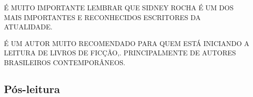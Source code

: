 \documentclass{extarticle}
\begin{document}

 
É MUITO IMPORTANTE LEMBRAR QUE SIDNEY ROCHA É UM DOS MAIS IMPORTANTES E
RECONHECIDOS ESCRITORES DA ATUALIDADE.
 
É UM AUTOR MUITO RECOMENDADO PARA QUEM ESTÁ INICIANDO A LEITURA DE
LIVROS DE FICÇÃO,. PRINCIPALMENTE DE AUTORES BRASILEIROS CONTEMPORÂNEOS.





\subsection{Pós-leitura}






\end{document}
